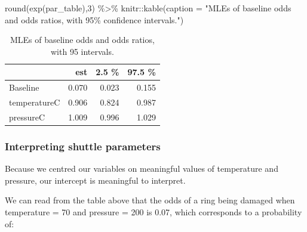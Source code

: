 \documentclass[
  openany]{book}
\newenvironment{Shaded}{\begin{snugshade}}{\end{snugshade}}
\newcommand{\AttributeTok}[1]{\textcolor[rgb]{0.77,0.63,0.00}{#1}}
\newcommand{\DecValTok}[1]{\textcolor[rgb]{0.00,0.00,0.81}{#1}}
\newcommand{\FunctionTok}[1]{\textcolor[rgb]{0.00,0.00,0.00}{#1}}
\newcommand{\NormalTok}[1]{#1}
\newcommand{\OtherTok}[1]{\textcolor[rgb]{0.56,0.35,0.01}{#1}}
\newcommand{\SpecialCharTok}[1]{\textcolor[rgb]{0.00,0.00,0.00}{#1}}
\newcommand{\StringTok}[1]{\textcolor[rgb]{0.31,0.60,0.02}{#1}}
\begin{document}
\begin{Shaded}
\end{Shaded}

\begin{Shaded}
\begin{Highlighting}[]
\FunctionTok{round}\NormalTok{(}\FunctionTok{exp}\NormalTok{(par\_table),}\DecValTok{3}\NormalTok{) }\SpecialCharTok{\%\textgreater{}\%} 
\NormalTok{  knitr}\SpecialCharTok{::}\FunctionTok{kable}\NormalTok{(}\AttributeTok{caption =} \StringTok{"MLEs of baseline odds and odds ratios, with 95\% confidence}
\StringTok{intervals."}\NormalTok{)}
\end{Highlighting}
\end{Shaded}

\begin{table}

\caption{\label{tab:shuttleSummaryExp}MLEs of baseline odds and odds ratios, with 95%
intervals.}
\centering
\begin{tabular}[t]{l|r|r|r}
\hline
  & est & 2.5 \% & 97.5 \%\\
\hline
Baseline & 0.070 & 0.023 & 0.155\\
\hline
temperatureC & 0.906 & 0.824 & 0.987\\
\hline
pressureC & 1.009 & 0.996 & 1.029\\
\hline
\end{tabular}
\end{table}

\hypertarget{interpreting-shuttle-parameters}{%
\subsubsection{Interpreting shuttle parameters}\label{interpreting-shuttle-parameters}}

Because we centred our variables on meaningful values of temperature and pressure, our intercept is meaningful to interpret.

We can read from the table above that the odds of a ring being damaged when temperature = 70 and pressure
= 200 is 0.07, which corresponds
to a probability of:
\end{document}
